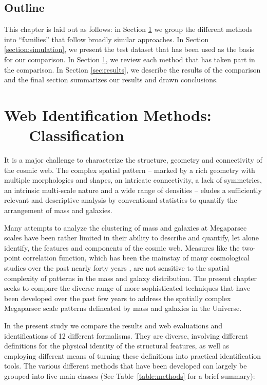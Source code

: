 \subsection{Outline}
This chapter is laid out as follows: in Section \ref{section:methods} we group the different methods into ``families'' that follow broadly similar approaches. In Section \ref{section:simulation}, we present the test dataset that has been used as the basis for our comparison. In Section \ref{section:methods}, we review each method that has taken part in the comparison. In Section \ref{sec:results}, we describe the results of the comparison and the final section summarizes our results and drawn conclusions.

\section{Web Identification Methods: \ \ \ Classification}
\label{section:methods}

%


It is a major challenge to characterize the structure, geometry and connectivity of the cosmic web. The complex spatial pattern -- marked  
by a rich geometry with multiple morphologies and shapes, an intricate connectivity, a lack of  symmetries, an intrinsic multi-scale nature and 
a wide range of densities -- eludes a sufficiently relevant and descriptive analysis by conventional statistics to quantify the arrangement of 
mass and galaxies. 

Many attempts to analyze the clustering of mass and galaxies at Megaparsec scales have been rather limited in their ability to describe and quantify, let 
alone identify, the features and components of the cosmic web. Measures like the two-point correlation function, which has been the mainstay of many 
cosmological studies over the past nearly forty years \citep{Peebles1980}, are not sensitive to the spatial complexity of patterns in the mass and galaxy distribution.  
The present chapter seeks to compare the diverse range of more sophisticated techniques that have been developed over the past few years to address the 
spatially complex Megaparsec scale patterns delineated by mass and galaxies in the Universe. 

In the present study we compare the results and web evaluations and identifications of 12 different formalisms. 
They are diverse, involving different definitions for the physical identity of the structural features, as well 
as employing different means of turning these definitions into practical identification tools. The various 
different methods that have been developed can largely be grouped into five main classes (See Table~\ref{table:methods} for a brief summary):

